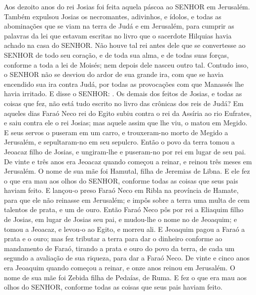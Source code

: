 {  Aos dezoito anos do rei Josias foi feita aquela páscoa ao SENHOR em Jerusalém.
  Também expulsou Josias os necromantes, adivinhos, e ídolos, e todas as abominações que se viam na terra de Judá e em Jerusalém, para cumprir as palavras da lei que estavam escritas no livro que o sacerdote Hilquias havia achado na casa do SENHOR.
  Não houve tal rei antes dele que se convertesse ao SENHOR de todo seu coração, e de toda sua alma, e de todas suas forças, conforme a toda a lei de Moisés; nem depois dele nasceu outro tal.
  Contudo isso, o SENHOR não se desviou do ardor de sua grande ira, com que se havia encendido sua ira contra Judá, por todas as provocações com que Manassés lhe havia irritado.
  E disse o SENHOR: .
  Os demais dos feitos de Josias, e todas as coisas que fez, não está tudo escrito no livro das crônicas dos reis de Judá?
  Em aqueles dias Faraó Neco rei do Egito subiu contra o rei da Assíria ao rio Eufrates, e saiu contra ele o rei Josias; mas aquele assim que lhe viu, o matou em Megido.
  E seus servos o puseram em um carro, e trouxeram-no morto de Megido a Jerusalém, e sepultaram-no em seu sepulcro. Então o povo da terra tomou a Jeoacaz filho de Josias, e ungiram-lhe e puseram-no por rei em lugar de seu pai.
  De vinte e três anos era Jeoacaz quando começou a reinar, e reinou três meses em Jerusalém. O nome de sua mãe foi Hamutal, filha de Jeremias de Libna.
  E ele fez o que era mau aos olhos do SENHOR, conforme todas as coisas que seus pais haviam feito.
  E lançou-o preso Faraó Neco em Ribla na província de Hamate, para que ele não reinasse em Jerusalém; e impôs sobre a terra uma multa de cem talentos de prata, e um de ouro.
  Então Faraó Neco pôs por rei a Eliaquim filho de Josias, em lugar de Josias seu pai, e mudou-lhe o nome no de Jeoaquim; e tomou a Jeoacaz, e levou-o ao Egito, e morreu ali.
  E Jeoaquim pagou a Faraó a prata e o ouro; mas fez tributar a terra para dar o dinheiro conforme ao mandamento de Faraó, tirando a prata e ouro do povo da terra, de cada um segundo a avaliação de sua riqueza, para dar a Faraó Neco.
  De vinte e cinco anos era Jeoaquim quando começou a reinar, e onze anos reinou em Jerusalém. O nome de sua mãe foi Zebida filha de Pedaías, de Ruma.
  E fez o que era mau aos olhos do SENHOR, conforme todas as coisas que seus pais haviam feito.
\par }

